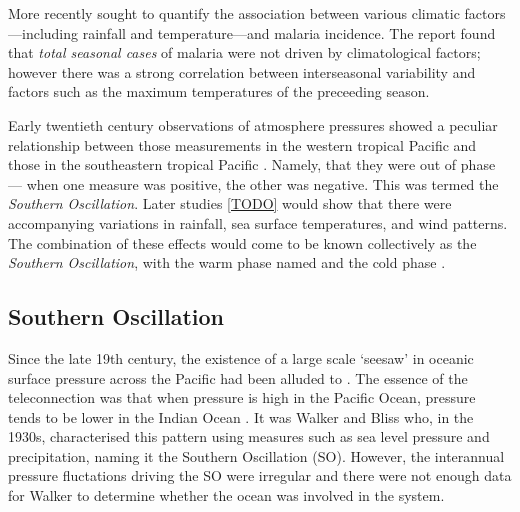 More recently \cite{craig2004} sought to quantify the association between
various climatic factors---including rainfall and temperature---and malaria
incidence. The report found that \emph{total seasonal cases} of malaria were not
driven by climatological factors; however there was a strong correlation between
interseasonal variability and factors such as the maximum temperatures of the
preceeding season.




\vspace{1cm}

Early twentieth century observations of atmosphere pressures showed a peculiar
relationship between those measurements in the western tropical Pacific and
those in the southeastern tropical Pacific \citep{holton1989}. Namely, that they
were out of phase --- when one measure was positive, the other was negative.
This was termed the \emph{Southern Oscillation}. Later studies \ref{TODO} would
show that there were accompanying variations in rainfall, sea surface
temperatures, and wind patterns. The combination of these effects would come to
be known collectively as the \elnino{} \emph{Southern Oscillation}, with the
warm phase named \elnino{} and the cold phase \nina{}.


\subsection{Southern Oscillation}
Since the late 19th century, the existence of a large scale `seesaw' in oceanic
surface pressure across the Pacific had been alluded to
\citep{trenberth2000}. The essence of the teleconnection was that when pressure
is high in the Pacific Ocean, pressure tends to be lower in the Indian Ocean
\citep{philander1990}. It was Walker and Bliss who, in the 1930s, characterised
this pattern using measures such as sea level pressure and precipitation, naming
it the Southern Oscillation (SO). However, the interannual pressure fluctations
driving the SO were irregular and there were not enough data for Walker to
determine whether the ocean was involved in the system.

